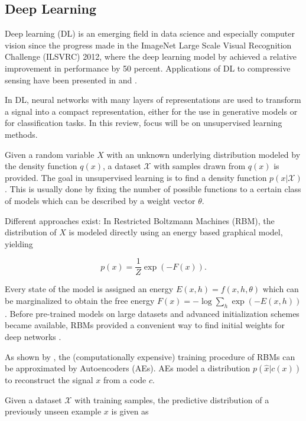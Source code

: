 \documentclass[10pt,twocolumn,a4paper]{article}
\newcommand{\abbr}[2]{#1 (#2)}
\newcommand{\abbrpl}[2]{#1s (#2s)}
\newcommand{\ds}{\mathcal X}
\begin{document}
\subsection{Deep Learning}

\abbr{Deep learning}{DL} is an emerging field in data science and especially computer vision since the progress made in the \abbr{ImageNet Large Scale Visual Recognition Challenge}{ILSVRC} 2012, where the deep learning model by \cite{Krizhevsky2012} achieved a relative improvement in performance by 50 percent.
Applications of DL to compressive sensing have been presented in \cite{Mousavi2015} and \cite{Palangi2015}.

In DL, neural networks with many layers of representations are used to transform a signal into a compact representation, either for the use in generative models or for classification tasks.
In this review, focus will be on unsupervised learning methods.

Given a random variable $X$ with an unknown underlying distribution modeled by the density function $q(x)$, a dataset $\mathcal X$ with samples drawn from $q(x)$ is provided.
The goal in unsupervised learning is to find a density function $p(x|\mathcal X)$.
This is usually done by fixing the number of possible functions to a certain class of models which can be described by a weight vector $\theta$.

Different approaches exist: In \abbr{Restricted Boltzmann Machines}{RBM}, the distribution of $X$ is modeled directly using an energy based graphical model, yielding

\begin{equation}
    p(x) = \frac{1}{Z} \exp(- F(x)).
\end{equation}

Every state of the model is assigned an energy $E(x, h) = f(x,h,\theta)$ which can be marginalized to obtain the free energy $F(x) = - \log \sum_h \exp (- E(x, h))$.
Before pre-trained models on large datasets and advanced initialization schemes became available, RBMs provided a convenient way to find initial weights for deep networks \cite{Hinton2006a}.

As shown by \cite{Bengio2007}, the (computationally expensive) training procedure of RBMs can be approximated by \abbrpl{Autoencoder}{AE}.
AEs model a distribution $p(\hat x | c(x) )$ to reconstruct the signal $x$ from a code $c$.

Given a dataset $\ds$ with training samples, the predictive distribution of a previously unseen example $x$ is given as
\end{document}

